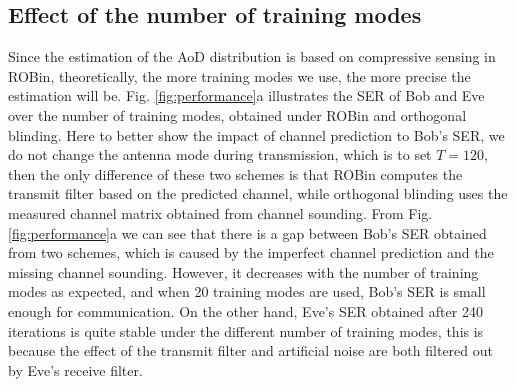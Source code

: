 
\subsection{Effect of the number of training modes}
Since the estimation of the AoD distribution is based on compressive sensing in ROBin, theoretically, the more training modes we use, the more precise the estimation will be. Fig. \ref{fig:performance}a illustrates the SER of Bob and Eve over the number of training modes, obtained under ROBin and orthogonal blinding. Here to better show the impact of channel prediction to Bob's SER, we do not change the antenna mode during transmission, which is to set $T = 120$, then the only difference of these two schemes is that ROBin computes the transmit filter based on the predicted channel, while orthogonal blinding uses the measured channel matrix obtained from channel sounding. 
From Fig. \ref{fig:performance}a we can see that there is a gap between Bob's SER obtained from two schemes, which is caused by the imperfect channel prediction and the missing channel sounding. However, it decreases with the number of training modes as expected, and when 20 training modes are used, Bob's SER is small enough for communication. On the other hand, Eve's SER obtained after 240 iterations is quite stable under the different number of training modes, this is because the effect of the transmit filter and artificial noise are both filtered out by Eve's receive filter.

